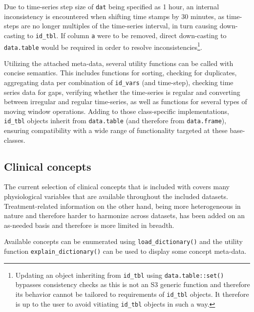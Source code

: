 \documentclass[
]{jss}
\begin{document}
Due to time-series step size of \texttt{dat} being specified as 1 hour,
an internal inconsistency is encountered when shifting time stamps by 30
minutes, as time-steps are no longer multiples of the time-series
interval, in turn causing down-casting to \texttt{id\_tbl}. If column
\texttt{a} were to be removed, direct down-casting to
\texttt{data.table} would be required in order to resolve
inconsistencies\footnote{Updating an object inheriting from
  \texttt{id\_tbl} using \texttt{data.table::set()} bypasses consistency
  checks as this is not an S3 generic function and therefore its
  behavior cannot be tailored to requirements of \texttt{id\_tbl}
  objects. It therefore is up to the user to avoid vitiating
  \texttt{id\_tbl} objects in such a way.}.

Utilizing the attached meta-data, several utility functions can be
called with concise semantics. This includes functions for sorting,
checking for duplicates, aggregating data per combination of
\texttt{id\_vars} (and time-step), checking time series data for gaps,
verifying whether the time-series is regular and converting between
irregular and regular time-series, as well as functions for several
types of moving window operations. Adding to those class-specific
implementations, \texttt{id\_tbl} objects inherit from
\texttt{data.table} (and therefore from \texttt{data.frame}), ensuring
compatibility with a wide range of functionality targeted at these
base-classes.

\hypertarget{clinical-concepts}{%
\subsection{Clinical concepts}\label{clinical-concepts}}

The current selection of clinical concepts that is included with
 covers many physiological variables that are available
throughout the included datasets. Treatment-related information on the
other hand, being more heterogeneous in nature and therefore harder to
harmonize across datasets, has been added on an as-needed basis and
therefore is more limited in breadth.

Available concepts can be enumerated using \texttt{load\_dictionary()}
and the utility function \texttt{explain\_dictionary()} can be used to
display some concept meta-data.
\end{document}
